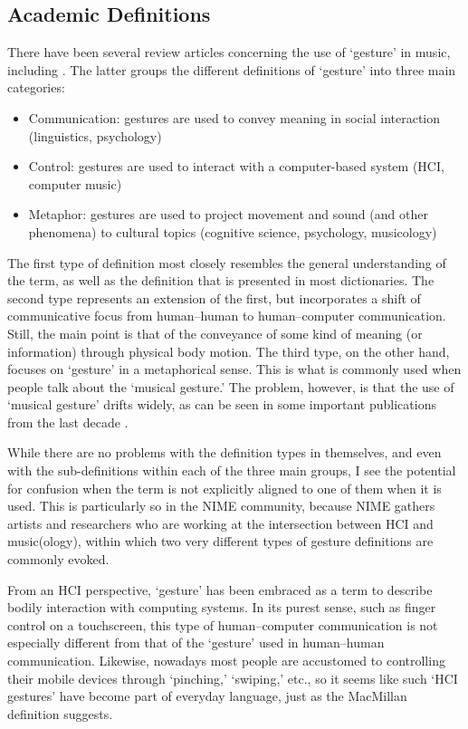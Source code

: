 \subsection{Academic Definitions}

There have been several review articles concerning the use of `gesture' in music, including  \cite{Cadoz:2000,Jensenius:2010}. The latter \cite{Jensenius:2010} groups the different definitions of `gesture' into three main categories:

\begin{itemize}
	\item Communication: gestures are used to convey meaning in social interaction (linguistics, psychology)
	\item Control: gestures are used to interact with a computer-based system (HCI, computer music)
	\item Metaphor: gestures are used to project movement and sound (and other phenomena) to cultural topics (cognitive science, psychology, musicology)
\end{itemize}

The first type of definition most closely resembles the general understanding of the term, as well as the definition that is presented in most dictionaries. The second type represents an extension of the first, but incorporates a shift of communicative focus from human--human to human--computer communication. Still, the main point is that of the conveyance of some kind of meaning (or information) through physical body motion. The third type, on the other hand, focuses on `gesture' in a metaphorical sense. This is what is commonly used when people talk about the `musical gesture.' The problem, however, is that the use of `musical gesture' drifts widely, as can be seen in some important publications from the last decade \cite{Godoy:2010,Gritten:2006,Gritten:2011,Hatten:2004}. 

While there are no problems with the definition types in themselves, and even with the sub-definitions within each of the three main groups, I see the potential for confusion when the term is not explicitly aligned to one of them when it is used. This is particularly so in the NIME community, because NIME gathers artists and researchers who are working at the intersection between HCI and music(ology), within which two very different types of gesture definitions are commonly evoked. 

From an HCI perspective, `gesture' has been embraced as a term to describe bodily interaction with computing systems. In its purest sense, such as finger control on a touchscreen, this type of human--computer communication is not especially different from that of the `gesture' used in human--human communication. Likewise, nowadays most people are accustomed to controlling their mobile devices through `pinching,' `swiping,' etc., so it seems like such `HCI gestures' have become part of everyday language, just as the MacMillan definition suggests. 

